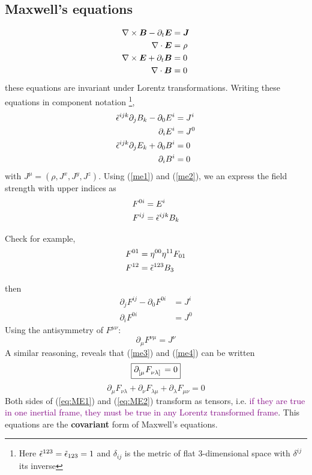 \subsection{Maxwell's equations}
\begin{align}\label{Maxwell's equations-1}
    \nabla\times\vb*{B}-\partial_t\vb*{E}&=\vb*{J}\\
    \nabla\cdot\vb*{E}&=\rho\\
    \nabla\times\vb*{E}+\partial_t\vb*{B}&=0\\
    \nabla\cdot\vb*{B}&=0
\end{align}
these equations are invariant under Lorentz transformations.
Writing these equations in component notation \footnote{Here $\Tilde{\epsilon}^{123}=\Tilde{\epsilon}_{123}=1$ and $\delta_{ij}$ is the metric of flat $3$-dimensional space with $\delta^{ij}$ its inverse},
\begin{align}
    \label{me1}\Tilde{\epsilon}^{ijk}\partial_j B_k-\partial_0 E^{i}&=J^{i}\\
    \label{me2}\partial_i E^{i}&=J^0\\
    \label{me3}\Tilde{\epsilon}^{ijk}\partial_j E_k+\partial_0 B^{i}&=0\\
    \partial_i B^{i}&=0\label{me4}
\end{align}
with $J^\mu=(\rho,J^x,J^y,J^z)$.
Using (\ref{me1}) and (\ref{me2}), we an express the field strength with upper indices as
\begin{align*}
    F^{0i}&=E^{i}\\
    F^{ij}&=\Tilde{\epsilon}^{ijk}B_k
\end{align*}
\begin{tcolorbox}
    Check for example,
    \begin{align*}
        F^{01}&=\eta^{00}\eta^{11}F_{01}\\
        F^{12}&=\Tilde{\epsilon}^{123}B_3
    \end{align*}
\end{tcolorbox}
then
\begin{align}
    \partial_jF^{ij}-\partial_0 F^{0i}&=J^{i}\\
    \partial_i F^{0i}&=J^0
\end{align}
Using the antisymmetry of $F^{\mu\nu}$:
\begin{equation}\label{eq:ME1}
    \boxed{\partial_\mu F^{\nu\mu}=J^\nu}
\end{equation}
A similar reasoning, reveals that (\ref{me3}) and (\ref{me4}) can be written
\begin{equation}\label{eq:ME2}
    \boxed{\tensor{\partial}{_{[\mu}}\tensor{F}{_{\nu\lambda]}}=0}
\end{equation}
\begin{equation*}
    \partial_\mu F_{\nu\lambda}+\partial_\nu F_{\lambda\mu}+\partial_\lambda F_{\mu\nu}=0
\end{equation*}
Both sides of (\ref{eq:ME1}) and (\ref{eq:ME2}) transform as tensors, i.e. \textcolor{purple}{if they are true in one inertial frame, they must be true in any Lorentz transformed frame}. This equations are the \textbf{covariant} form of Maxwell's equations.

